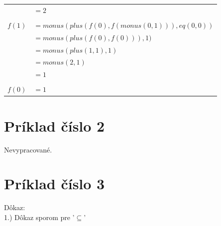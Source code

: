 \documentclass[11pt,a4paper]{article}
\begin{document}
\begin{tabular}{rl}
                    & $= 2$\\
\\[-0.5em]
$f(1)$\hspace{-3mm} & $= monus(plus(f(0),f(monus(0,1))),eq(0,0))$\\
                    & $= monus(plus(f(0),f(0))),1)$\\
                    & $= monus(plus(1,1),1)$\\
                    & $= monus(2,1)$\\
                    & $= 1$\\
\\[-0.5em]
$f(0)$\hspace{-3mm} & $= 1$\\
\end{tabular}

\newpage
\section{Príklad číslo 2}

Nevypracované.

\newpage
\section{Príklad číslo 3}

Dôkaz:\\[-0.5em]

\hspace{5mm}1.) Dôkaz sporom pre '$\subseteq$'
\end{document}
